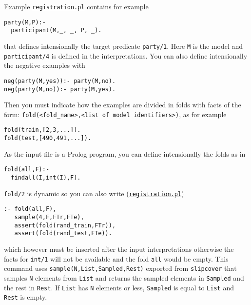 Example \href{http://cplint.lamping.unife.it/example/learning/registration.pl}{\texttt{registration.pl}} contains for example
\begin{verbatim}
party(M,P):-
  participant(M,_, _, P, _).
\end{verbatim}
that defines intensionally the target predicate \verb|party/1|. Here \verb|M| is the model and \verb|participant/4| is defined in the interpretations.
You can also define intensionally the negative examples with
\begin{verbatim}
neg(party(M,yes)):- party(M,no).
neg(party(M,no)):- party(M,yes).
\end{verbatim}
Then you must indicate how the examples are divided in folds with facts of the form:
\verb|fold(<fold_name>,<list of model identifiers>)|, as for example
\begin{verbatim}
fold(train,[2,3,...]).
fold(test,[490,491,...]).
\end{verbatim}
As the input file is a Prolog program, you can define intensionally the folds as in
\begin{verbatim}
fold(all,F):-
  findall(I,int(I),F).
\end{verbatim}
\verb|fold/2| is dynamic so you can also write (\href{http://cplint.lamping.unife.it/example/learning/registration.pl}{\texttt{registration.pl}})
\begin{verbatim}
:- fold(all,F),
   sample(4,F,FTr,FTe),
   assert(fold(rand_train,FTr)),
   assert(fold(rand_test,FTe)).
\end{verbatim}
which however must be inserted after the input interpretations otherwise the facts for \verb|int/1| will not be available and
the fold \verb|all| would be empty. This command uses  \verb|sample(N,List,Sampled,Rest)| exported from \verb|slipcover| that samples \verb|N| elements from \verb|List| and returns the sampled elements in \verb|Sampled| and the rest in \verb|Rest|. If \verb|List| has \verb|N| elements or less, \verb|Sampled| is equal to \verb|List| 
and \verb|Rest| is empty.
